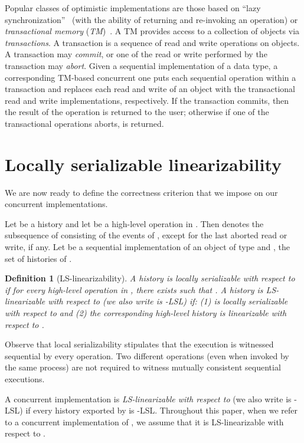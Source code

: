 \documentclass[11pt,pdftex,letterpaper]{article}
\newtheorem{definition}[theorem]{Definition}
\newcommand{\LS}{LS}
\begin{document}
Popular classes of optimistic implementations are those based on
``lazy synchronization''~\cite{HHL+05,HS08-book} (with the ability of
returning  and re-invoking an operation) or   
 \emph{transactional memory} (\emph{TM})~\cite{HM93,ST95,HLR10}.
A TM provides access to a
collection of objects via \emph{transactions}.
A transaction is a sequence of read and write operations on
objects. A transaction may \emph{commit},
or one of the read or write performed by the transaction may \emph{abort}.
Given a sequential implementation of a data type, 
a corresponding TM-based concurrent one 
puts each sequential operation within a
transaction and replaces each read and write of an object  with the
transactional read and write implementations, respectively. 
If the transaction commits, then the result of the operation is
returned to the user; otherwise if one of the transactional operations aborts,  is returned.


\section{Locally serializable linearizability}
\label{sec:lin}
We are now ready to define the correctness criterion that we impose on our
concurrent implementations.

Let  be a history and let  be a high-level operation in . 
Then  denotes the subsequence of  consisting of the events
of , except for the last aborted read or write, if any.
Let  be a sequential implementation of an object of type
 and , the set of histories of . 
\begin{definition}[LS-linearizability]
\label{def:lin}
A history  is \emph{locally serializable with respect to}
 if for every high-level operation  in ,
there exists  such that .
A history  is \emph{\LS-linearizable with respect to
}  (we also write  is -LSL)  if:
(1)  is locally serializable with respect to
 and (2) the corresponding high-level history  
is linearizable with respect to .
\end{definition}
Observe that local serializability stipulates that the execution is 
witnessed sequential by every operation.
Two different operations (even when invoked by the same process) are not
required to witness mutually consistent sequential executions.

A concurrent implementation  is \emph{\LS-linearizable with respect to
} (we also write  is -LSL)
if every history exported by  is -LSL.   
Throughout this paper, when we refer to a concurrent implementation of , 
we assume that it is \LS-linearizable with respect to .
\end{document}
